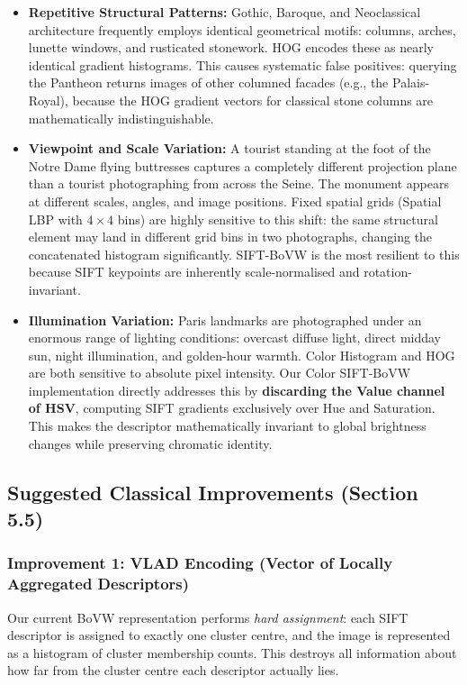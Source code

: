 \documentclass[11pt, a4paper]{article}
\begin{document}
\begin{itemize}
  \item \textbf{Repetitive Structural Patterns:} Gothic, Baroque, and Neoclassical architecture frequently employs identical geometrical motifs: columns, arches, lunette windows, and rusticated stonework. HOG encodes these as nearly identical gradient histograms. This causes systematic false positives: querying the Pantheon returns images of other columned facades (e.g., the Palais-Royal), because the HOG gradient vectors for classical stone columns are mathematically indistinguishable.
  \item \textbf{Viewpoint and Scale Variation:} A tourist standing at the foot of the Notre Dame flying buttresses captures a completely different projection plane than a tourist photographing from across the Seine. The monument appears at different scales, angles, and image positions. Fixed spatial grids (Spatial LBP with $4\times4$ bins) are highly sensitive to this shift: the same structural element may land in different grid bins in two photographs, changing the concatenated histogram significantly. SIFT-BoVW is the most resilient to this because SIFT keypoints are inherently scale-normalised and rotation-invariant.
  \item \textbf{Illumination Variation:} Paris landmarks are photographed under an enormous range of lighting conditions: overcast diffuse light, direct midday sun, night illumination, and golden-hour warmth. Color Histogram and HOG are both sensitive to absolute pixel intensity. Our Color SIFT-BoVW implementation directly addresses this by \textbf{discarding the Value channel of HSV}, computing SIFT gradients exclusively over Hue and Saturation. This makes the descriptor mathematically invariant to global brightness changes while preserving chromatic identity.
\end{itemize}

\subsection{Suggested Classical Improvements (Section 5.5)}

\subsubsection{Improvement 1: VLAD Encoding (Vector of Locally Aggregated Descriptors)}

Our current BoVW representation performs \textit{hard assignment}: each SIFT descriptor is assigned to exactly one cluster centre, and the image is represented as a histogram of cluster membership counts. This destroys all information about how far from the cluster centre each descriptor actually lies.
\end{document}
